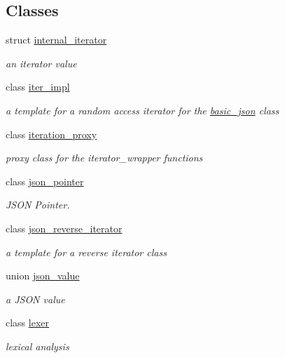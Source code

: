 \subsection*{Classes}
\begin{DoxyCompactItemize}
\item 
struct \hyperlink{structnlohmann_1_1basic__json_1_1internal__iterator}{internal\+\_\+iterator}
\begin{DoxyCompactList}\small\item\em an iterator value \end{DoxyCompactList}\item 
class \hyperlink{classnlohmann_1_1basic__json_1_1iter__impl}{iter\+\_\+impl}
\begin{DoxyCompactList}\small\item\em a template for a random access iterator for the \hyperlink{classnlohmann_1_1basic__json}{basic\+\_\+json} class \end{DoxyCompactList}\item 
class \hyperlink{classnlohmann_1_1basic__json_1_1iteration__proxy}{iteration\+\_\+proxy}
\begin{DoxyCompactList}\small\item\em proxy class for the iterator\+\_\+wrapper functions \end{DoxyCompactList}\item 
class \hyperlink{classnlohmann_1_1basic__json_1_1json__pointer}{json\+\_\+pointer}
\begin{DoxyCompactList}\small\item\em J\+S\+O\+N Pointer. \end{DoxyCompactList}\item 
class \hyperlink{classnlohmann_1_1basic__json_1_1json__reverse__iterator}{json\+\_\+reverse\+\_\+iterator}
\begin{DoxyCompactList}\small\item\em a template for a reverse iterator class \end{DoxyCompactList}\item 
union \hyperlink{unionnlohmann_1_1basic__json_1_1json__value}{json\+\_\+value}
\begin{DoxyCompactList}\small\item\em a J\+S\+O\+N value \end{DoxyCompactList}\item 
class \hyperlink{classnlohmann_1_1basic__json_1_1lexer}{lexer}
\begin{DoxyCompactList}\small\item\em lexical analysis \end{DoxyCompactList}\item 

\end{DoxyCompactItemize}
